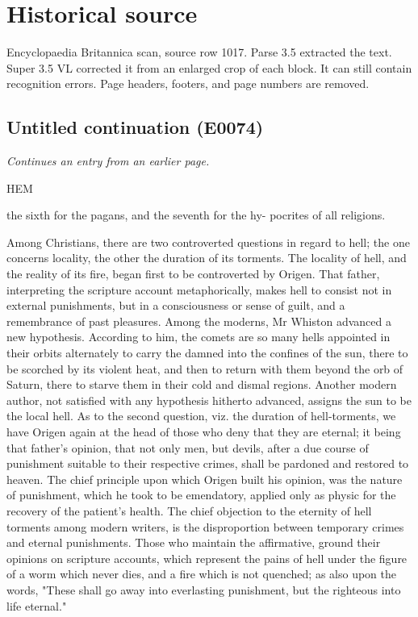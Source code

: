 \documentclass{article}
\begin{document}
\section*{Historical source}
Encyclopaedia Britannica scan, source row 1017. Parse 3.5 extracted the text. Super 3.5 VL corrected it from an enlarged crop of each block. It can still contain recognition errors.
Page headers, footers, and page numbers are removed.

\subsection*{Untitled continuation (E0074)}
\textit{Continues an entry from an earlier page.}

HEM

the sixth for the pagans, and the seventh for the hy-
pocrites of all religions.

Among Christians, there are two controverted questions in regard to hell; the one concerns locality, the other the duration of its torments. The locality of hell, and the reality of its fire, began first to be controverted by Origen. That father, interpreting the scripture account metaphorically, makes hell to consist not in external punishments, but in a consciousness or sense of guilt, and a remembrance of past pleasures. Among the moderns, Mr Whiston advanced a new hypothesis. According to him, the comets are so many hells appointed in their orbits alternately to carry the damned into the confines of the sun, there to be scorched by its violent heat, and then to return with them beyond the orb of Saturn, there to starve them in their cold and dismal regions. Another modern author, not satisfied with any hypothesis hitherto advanced, assigns the sun to be the local hell. As to the second question, viz. the duration of hell-torments, we have Origen again at the head of those who deny that they are eternal; it being that father's opinion, that not only men, but devils, after a due course of punishment suitable to their respective crimes, shall be pardoned and restored to heaven. The chief principle upon which Origen built his opinion, was the nature of punishment, which he took to be emendatory, applied only as physic for the recovery of the patient's health. The chief objection to the eternity of hell torments among modern writers, is the disproportion between temporary crimes and eternal punishments. Those who maintain the affirmative, ground their opinions on scripture accounts, which represent the pains of hell under the figure of a worm which never dies, and a fire which is not quenched; as also upon the words, "These shall go away into everlasting punishment, but the righteous into life eternal."
\end{document}
